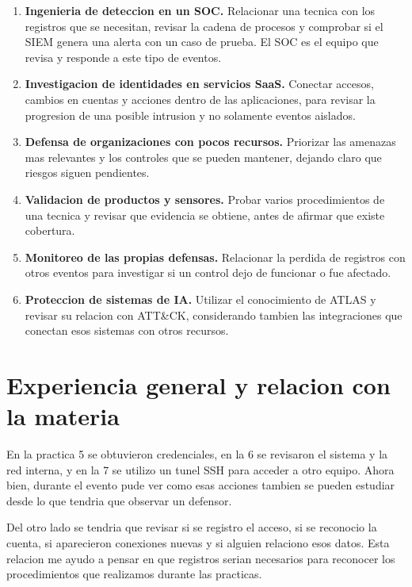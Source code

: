\documentclass[letterpaper,12pt]{article}
\begin{document}
\begin{enumerate}
    \item \textbf{Ingenieria de deteccion en un SOC.} Relacionar una tecnica con los registros que se necesitan, revisar la cadena de procesos y comprobar si el SIEM genera una alerta con un caso de prueba. El SOC es el equipo que revisa y responde a este tipo de eventos.
    \item \textbf{Investigacion de identidades en servicios SaaS.} Conectar accesos, cambios en cuentas y acciones dentro de las aplicaciones, para revisar la progresion de una posible intrusion y no solamente eventos aislados.
    \item \textbf{Defensa de organizaciones con pocos recursos.} Priorizar las amenazas mas relevantes y los controles que se pueden mantener, dejando claro que riesgos siguen pendientes.
    \item \textbf{Validacion de productos y sensores.} Probar varios procedimientos de una tecnica y revisar que evidencia se obtiene, antes de afirmar que existe cobertura.
    \item \textbf{Monitoreo de las propias defensas.} Relacionar la perdida de registros con otros eventos para investigar si un control dejo de funcionar o fue afectado.
    \item \textbf{Proteccion de sistemas de IA.} Utilizar el conocimiento de ATLAS y revisar su relacion con ATT\&CK, considerando tambien las integraciones que conectan esos sistemas con otros recursos.
\end{enumerate}



\section{Experiencia general y relacion con la materia}

En la practica 5 se obtuvieron credenciales, en la 6 se revisaron el
sistema y la red interna, y en la 7 se utilizo un tunel SSH para
acceder a otro equipo. Ahora bien, durante el evento pude ver
como esas acciones tambien se pueden estudiar desde lo que
tendria que observar un defensor.

Del otro lado se tendria
que revisar si se registro el acceso, si se reconocio la cuenta,
si aparecieron conexiones nuevas y si alguien relaciono esos
datos. Esta relacion me ayudo a pensar en que registros serian
necesarios para reconocer los procedimientos que realizamos
durante las practicas.
\end{document}
